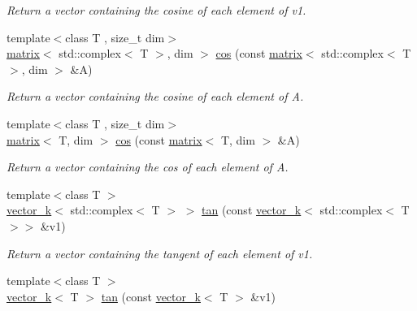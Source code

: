 \begin{DoxyCompactItemize}
\begin{DoxyCompactList}\small\item\em Return a vector containing the cosine of each element of v1. \end{DoxyCompactList}\item 
\hypertarget{namespacekeycpp_a918a1ad9493c25e0afb4d2a37af24d25}{{\footnotesize template$<$class T , size\-\_\-t dim$>$ }\\\hyperlink{classkeycpp_1_1matrix}{matrix}$<$ std\-::complex$<$ T $>$, dim $>$ \hyperlink{namespacekeycpp_a918a1ad9493c25e0afb4d2a37af24d25}{cos} (const \hyperlink{classkeycpp_1_1matrix}{matrix}$<$ std\-::complex$<$ T $>$, dim $>$ \&A)}\label{namespacekeycpp_a918a1ad9493c25e0afb4d2a37af24d25}

\begin{DoxyCompactList}\small\item\em Return a vector containing the cosine of each element of A. \end{DoxyCompactList}\item 
\hypertarget{namespacekeycpp_a882ae0fcbeee4b61db0483546cf76021}{{\footnotesize template$<$class T , size\-\_\-t dim$>$ }\\\hyperlink{classkeycpp_1_1matrix}{matrix}$<$ T, dim $>$ \hyperlink{namespacekeycpp_a882ae0fcbeee4b61db0483546cf76021}{cos} (const \hyperlink{classkeycpp_1_1matrix}{matrix}$<$ T, dim $>$ \&A)}\label{namespacekeycpp_a882ae0fcbeee4b61db0483546cf76021}

\begin{DoxyCompactList}\small\item\em Return a vector containing the cos of each element of A. \end{DoxyCompactList}\item 
\hypertarget{namespacekeycpp_a25563b8ed483cdd3bbbaf647beb76ba8}{{\footnotesize template$<$class T $>$ }\\\hyperlink{classkeycpp_1_1vector__k}{vector\-\_\-k}$<$ std\-::complex$<$ T $>$ $>$ \hyperlink{namespacekeycpp_a25563b8ed483cdd3bbbaf647beb76ba8}{tan} (const \hyperlink{classkeycpp_1_1vector__k}{vector\-\_\-k}$<$ std\-::complex$<$ T $>$$>$ \&v1)}\label{namespacekeycpp_a25563b8ed483cdd3bbbaf647beb76ba8}

\begin{DoxyCompactList}\small\item\em Return a vector containing the tangent of each element of v1. \end{DoxyCompactList}\item 
\hypertarget{namespacekeycpp_a90f340395d16b059204d507250945f35}{{\footnotesize template$<$class T $>$ }\\\hyperlink{classkeycpp_1_1vector__k}{vector\-\_\-k}$<$ T $>$ \hyperlink{namespacekeycpp_a90f340395d16b059204d507250945f35}{tan} (const \hyperlink{classkeycpp_1_1vector__k}{vector\-\_\-k}$<$ T $>$ \&v1)}\label{namespacekeycpp_a90f340395d16b059204d507250945f35}


\end{DoxyCompactItemize}
